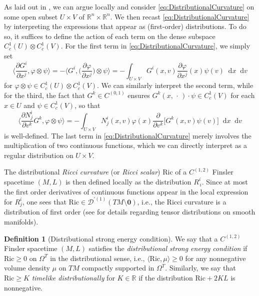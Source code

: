 \documentclass[a4paper,11pt]{article}
\numberwithin{equation}{section}
\theoremstyle{definition}
\newtheorem{Definition}{Definition}[section]
\theoremstyle{plain}
\newcommand{\R}{\mathbb R}
\newcommand{\Ric}{\mathrm{Ric}}
\newcommand*\diff{\mathop{}\!\mathrm{d}}
\begin{document}
As laid out in \cite[Sec.\ 3.2]{Graf-SingularityC1}, we can argue locally and consider \eqref{eq:DistributionalCurvature} on some open subset $U \times V$ of $\R^n \times \R^n$.
We then recast \eqref{eq:DistributionalCurvature} by interpreting the expressions that appear as (first-order) distributions. 
To do so, it suffices to define the action of each term on the dense subspace $C^1_c(U) \otimes C^1_c(V)$.
For the first term in \eqref{eq:DistributionalCurvature}, we simply set
\begin{equation*}
    \biggl\langle \frac{\partial G^i}{\partial x^j}, \varphi \otimes \psi \biggr\rangle = - \biggl\langle G^{i}, \biggr(\frac{\partial\varphi}{\partial x^j} \biggr) \otimes \psi \biggr\rangle = - \int_{U \times V} G^i(x,v)\frac{\partial\varphi}{\partial x^j}(x) \psi(v) \diff x \diff v
\end{equation*}
for $\varphi \otimes \psi \in C^1_c(U) \otimes C^1_c(V)$.
We can similarly interpret the second term, while for the third, the fact that $G^k \in C^{(0,1)}$ ensures $G^k(x, \, \cdot \,) \cdot \psi \in C^1_c(V)$ for each $x \in U$ and $\psi \in C^1_c(V)$, so that
\begin{equation*}
    \biggl\langle \frac{\partial N^i_j}{\partial v^k}G^k, \varphi\otimes \psi \biggr\rangle =  - \int_{U \times V} N^{i}_j(x,v) \varphi(x) \frac{\partial}{\partial v^k}\bigl[ G^k(x,v)\psi(v) \bigr] \diff x \diff v
\end{equation*}
is well-defined.
The last term in \eqref{eq:DistributionalCurvature} merely involves the multiplication of two continuous functions, which we can directly interpret as a regular distribution on $U \times V$.

The distributional \emph{Ricci curvature} (or \emph{Ricci scalar}) $\Ric$ of a $C^{(1,2)}$ Finsler spacetime $(M,L)$ is then defined locally as the distribution $R^{i}_{\, i}$. 
Since at most the first order derivatives of continuous functions appear in the local expression for $R^i_j$, one sees that $\Ric \in \mathcal{D}^{'(1)}(TM \setminus \mathbf 0)$, i.e., the Ricci curvature is a distribution of first order (see \cite{KOSS} for details regarding tensor distributions on smooth manifolds).


\begin{Definition}[Distributional strong energy condition]
\label{Definition: distributional strong energy}
We say that a $C^{(1,2)}$ Finsler spacetime $(M,L)$ satisfies the \emph{distributional strong energy condition} if $\Ric \geq 0$ on $\Omega^T$ in the distributional sense, i.e., $\langle \Ric, \mu\rangle \geq 0$ for any nonnegative volume density $\mu$ on $TM$ compactly supported in $\Omega^T$.
Similarly, we say that $\Ric \geq K$ \emph{timelike distributionally} for $K \in \R$ if the distribution $\Ric + 2 K L$ is nonnegative.
\end{Definition}
\end{document}
